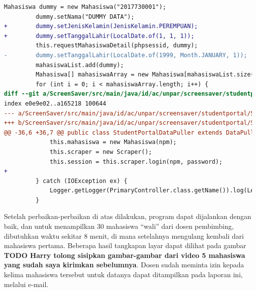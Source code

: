 \begin{lstlisting}[language=diff, caption=Perbedaan kode dosen dengan mahasiswa, label=diff_dosen_mahasiswa]
         Mahasiswa dummy = new Mahasiswa("2017730001");
         dummy.setNama("DUMMY DATA");
+        dummy.setJenisKelamin(JenisKelamin.PEREMPUAN);
+        dummy.setTanggalLahir(LocalDate.of(1, 1, 1));
         this.requestMahasiswaDetail(phpsessid, dummy);
-        dummy.setTanggalLahir(LocalDate.of(1999, Month.JANUARY, 1));
         mahasiswaList.add(dummy);
         Mahasiswa[] mahasiswaArray = new Mahasiswa[mahasiswaList.size()];
         for (int i = 0; i < mahasiswaArray.length; i++) {
diff --git a/ScreenSaver/src/main/java/id/ac/unpar/screensaver/studentportal/StudentPortalDataPuller.java b/ScreenSaver/src/main/java/id/ac/unpar/screensaver/studentportal/StudentPortalDataPuller.java
index e0e9e02..a165218 100644
--- a/ScreenSaver/src/main/java/id/ac/unpar/screensaver/studentportal/StudentPortalDataPuller.java
+++ b/ScreenSaver/src/main/java/id/ac/unpar/screensaver/studentportal/StudentPortalDataPuller.java
@@ -36,6 +36,7 @@ public class StudentPortalDataPuller extends DataPuller {
             this.mahasiswa = new Mahasiswa(npm);
             this.scraper = new Scraper();
             this.session = this.scraper.login(npm, password);
+
         } catch (IOException ex) {
             Logger.getLogger(PrimaryController.class.getName()).log(Level.SEVERE, null, ex);
         }
\end{lstlisting}

Setelah perbaikan-perbaikan di atas dilakukan, program dapat dijalankan dengan baik, dan untuk menampilkan 30 mahasiswa ``wali'' dari dosen pembimbing, dibutuhkan waktu sekitar 8 menit, di mana setelahnya mengulang kembali dari mahasiswa pertama. Beberapa hasil tangkapan layar dapat dilihat pada gambar \textbf{TODO Harry tolong sisipkan gambar-gambar dari video 5 mahasiswa yang sudah saya kirimkan sebelumnya}. Dosen sudah meminta izin kepada kelima mahasiswa tersebut untuk datanya dapat ditampilkan pada laporan ini, melalui e-mail.